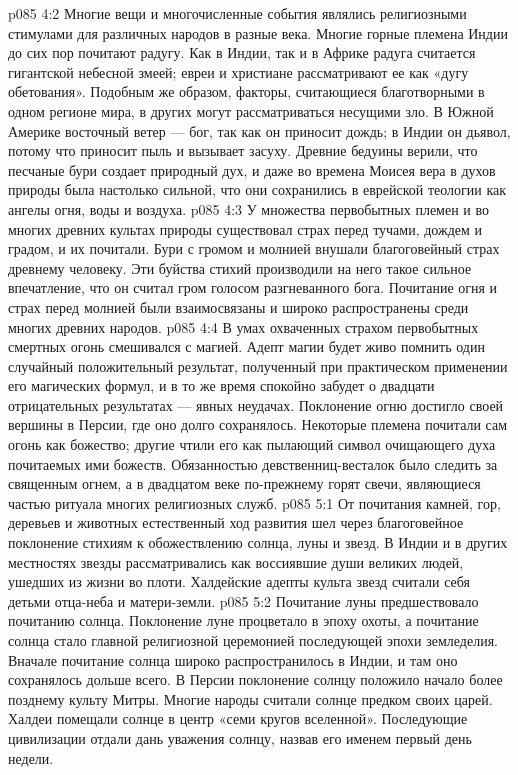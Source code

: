 \vs p085 4:2 Многие вещи и многочисленные события являлись религиозными стимулами для различных народов в разные века. Многие горные племена Индии до сих пор почитают радугу. Как в Индии, так и в Африке радуга считается гигантской небесной змеей; евреи и христиане рассматривают ее как «дугу обетования». Подобным же образом, факторы, считающиеся благотворными в одном регионе мира, в других могут рассматриваться несущими зло. В Южной Америке восточный ветер --- бог, так как он приносит дождь; в Индии он дьявол, потому что приносит пыль и вызывает засуху. Древние бедуины верили, что песчаные бури создает природный дух, и даже во времена Моисея вера в духов природы была настолько сильной, что они сохранились в еврейской теологии как ангелы огня, воды и воздуха.
\vs p085 4:3 У множества первобытных племен и во многих древних культах природы существовал страх перед тучами, дождем и градом, и их почитали. Бури с громом и молнией внушали благоговейный страх древнему человеку. Эти буйства стихий производили на него такое сильное впечатление, что он считал гром голосом разгневанного бога. Почитание огня и страх перед молнией были взаимосвязаны и широко распространены среди многих древних народов.
\vs p085 4:4 В умах охваченных страхом первобытных смертных огонь смешивался с магией. Адепт магии будет живо помнить один случайный положительный результат, полученный при практическом применении его магических формул, и в то же время спокойно забудет о двадцати отрицательных результатах --- явных неудачах. Поклонение огню достигло своей вершины в Персии, где оно долго сохранялось. Некоторые племена почитали сам огонь как божество; другие чтили его как пылающий символ очищающего духа почитаемых ими божеств. Обязанностью девственниц\hyp{}весталок было следить за священным огнем, а в двадцатом веке по\hyp{}прежнему горят свечи, являющиеся частью ритуала многих религиозных служб.
\vs p085 5:1 От почитания камней, гор, деревьев и животных естественный ход развития шел через благоговейное поклонение стихиям к обожествлению солнца, луны и звезд. В Индии и в других местностях звезды рассматривались как воссиявшие души великих людей, ушедших из жизни во плоти. Халдейские адепты культа звезд считали себя детьми отца\hyp{}неба и матери\hyp{}земли.
\vs p085 5:2 Почитание луны предшествовало почитанию солнца. Поклонение луне процветало в эпоху охоты, а почитание солнца стало главной религиозной церемонией последующей эпохи земледелия. Вначале почитание солнца широко распространилось в Индии, и там оно сохранялось дольше всего. В Персии поклонение солнцу положило начало более позднему культу Митры. Многие народы считали солнце предком своих царей. Халдеи помещали солнце в центр «семи кругов вселенной». Последующие цивилизации отдали дань уважения солнцу, назвав его именем первый день недели.

